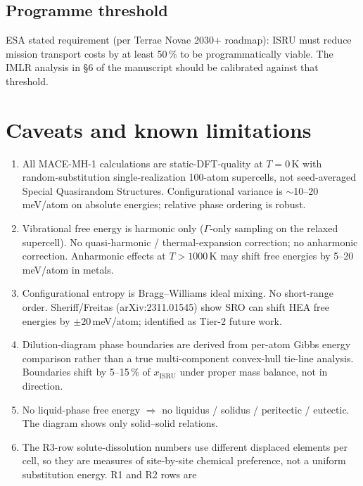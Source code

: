 \documentclass[11pt,a4paper]{article}
\begin{document}
\subsection{Programme threshold}

ESA stated requirement (per Terrae Novae 2030+ roadmap): ISRU must reduce
mission transport costs by at least 50\,\% to be programmatically viable.
The IMLR analysis in \S6 of the manuscript should be calibrated against
that threshold.

\section{Caveats and known limitations}
\label{sec:caveats}

\begin{enumerate}[(C1)]
  \item All MACE-MH-1 calculations are static-DFT-quality at $T = 0$\,K with
        random-substitution single-realization 100-atom supercells, not
        seed-averaged Special Quasirandom Structures. Configurational
        variance is $\sim$10--20\,meV/atom on absolute energies; relative
        phase ordering is robust.
  \item Vibrational free energy is harmonic only ($\Gamma$-only sampling on
        the relaxed supercell). No quasi-harmonic / thermal-expansion
        correction; no anharmonic correction. Anharmonic effects at $T >
        1000$\,K may shift free energies by 5--20\,meV/atom in metals.
  \item Configurational entropy is Bragg--Williams ideal mixing. No
        short-range order. Sheriff/Freitas (arXiv:2311.01545) show SRO can
        shift HEA free energies by $\pm 20$\,meV/atom; identified as Tier-2
        future work.
  \item Dilution-diagram phase boundaries are derived from per-atom Gibbs
        energy comparison rather than a true multi-component convex-hull
        tie-line analysis. Boundaries shift by 5--15\,\% of $x_{\text{ISRU}}$
        under proper mass balance, not in direction.
  \item No liquid-phase free energy $\Rightarrow$ no liquidus / solidus /
        peritectic / eutectic. The diagram shows only solid--solid relations.
  \item The R3-row solute-dissolution numbers use different displaced
        elements per cell, so they are measures of site-by-site chemical
        preference, not a uniform substitution energy. R1 and R2 rows are

\end{enumerate}
\end{document}
